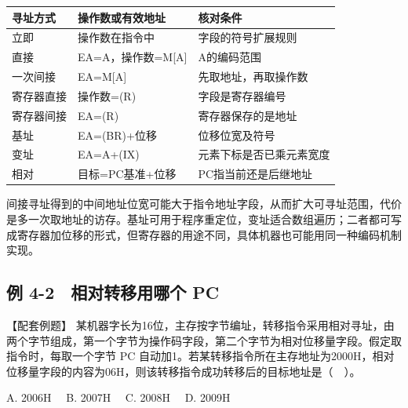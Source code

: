 \begin{wideblock}

\par\medskip\noindent\begin{minipage}{\linewidth}\fontsize{9.3}{12}\selectfont\begin{tabularx}{\linewidth}{@{}YYY@{}}
\toprule\noalign{}
寻址方式 & 操作数或有效地址 & 核对条件 \\
\midrule\noalign{}


立即 & 操作数在指令中 & 字段的符号扩展规则 \\
直接 & EA=A，操作数=M{[}A{]} & A的编码范围 \\
一次间接 & EA=M{[}A{]} & 先取地址，再取操作数 \\
寄存器直接 & 操作数=(R) & 字段是寄存器编号 \\
寄存器间接 & EA=(R) & 寄存器保存的是地址 \\
基址 & EA=(BR)+位移 & 位移位宽及符号 \\
变址 & EA=A+(IX) & 元素下标是否已乘元素宽度 \\
相对 & 目标=PC基准+位移 & PC指当前还是后继地址 \\
\bottomrule\end{tabularx}
\end{minipage}\par\medskip

\end{wideblock}

间接寻址得到的中间地址位宽可能大于指令地址字段，从而扩大可寻址范围，代价是多一次取地址的访存。基址可用于程序重定位，变址适合数组遍历；二者都可写成寄存器加位移的形式，但寄存器的用途不同，具体机器也可能用同一种编码机制实现。

\subsection{例 4-2　相对转移用哪个 PC}\label{CO04-05}

\begin{example}[配套例题]

【配套例题】 某机器字长为16位，主存按字节编址，转移指令采用相对寻址，由两个字节组成，第一个字节为操作码字段，第二个字节为相对位移量字段。假定取指令时，每取一个字节 PC 自动加1。若某转移指令所在主存地址为2000H，相对位移量字段的内容为06H，则该转移指令成功转移后的目标地址是（　）。

A. 2006H　 B. 2007H　 C. 2008H　 D. 2009H

\end{example}


